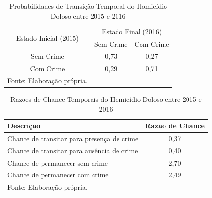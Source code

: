 \documentclass[12pt,openright,oneside,a4paper,english,french,spanish]{abntex2}
\numberwithin{table}{section} %
\numberwithin{figure}{section} %
\begin{document}
\begin{subappendices}
\begin{table}[H]
\centering
\caption{Probabilidades de Transição Temporal do Homicídio Doloso entre 2015 e 2016}
        \begin{tabular}{ccc}
            \hline
            \multirow{2}{*}{Estado Inicial (2015)} & \multicolumn{2}{c}{Estado Final (2016)}  \\\cline{2-3} 
                                     & \multicolumn{1}{l}{Sem Crime} & \multicolumn{1}{l}{Com Crime} \\\hline
            {Sem Crime} & {0,73} & {0,27} \\                \hline
            {Com Crime} & {0,29} & {0,71} \\                \hline
            \tiny Fonte: Elaboração própria.
        \end{tabular}
    \label{tab:prob_tempo_hom_dol_2015_2016}
\end{table}

\begin{table}[H]
\centering
\caption{Razões de Chance Temporais do Homicídio Doloso entre 2015 e 2016}
        \begin{tabular}{lc}
            \hline
            {\textbf{Descrição}} & {\textbf{Razão de Chance}} \\\hline
            {Chance de transitar para presença de crime} & {0,37} \\
            {Chance de transitar para ausência de crime} & {0,40} \\
            {Chance de permanecer sem crime} & {2,70} \\
            {Chance de permanecer com crime} & {2,49} \\\hline
            \tiny Fonte: Elaboração própria.
        \end{tabular}
    \label{tab:odds_tempo_hom_dol_2015_2016}
\end{table}



\end{subappendices}
\end{document}
